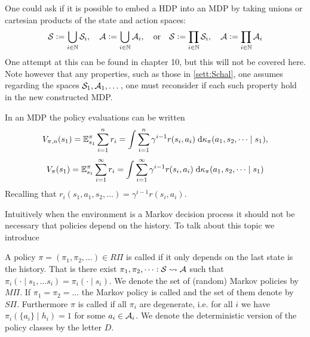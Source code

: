 \begin{rem}
  One could ask if it is possible to embed a HDP into an MDP
  by taking unions or cartesian products of the state and action spaces:
  \[ \mathcal{S} \vcentcolon= \bigcup_{i\in\mathbb{N}} \mathcal{S}_i, \quad
    \mathcal{A} \vcentcolon= \bigcup_{i\in\mathbb{N}} \mathcal{A}_i,
    \quad \mathrm{or} \quad
    \mathcal{S} \vcentcolon= \prod_{i\in\mathbb{N}} \mathcal{S}_i, \quad
  \mathcal{A} \vcentcolon= \prod_{i\in\mathbb{N}} \mathcal{A}_i \]
  One attempt at this can be found in  chapter 10,
  but this will not be covered here. %
  Note however that any properties, such as those in \cref{sett:Schal},
  one assumes regarding the spaces $\mathcal{S}_1, \mathcal{A}_1, \dots$, one must 
  reconsider if each such property hold in the new constructed MDP.
\end{rem}

\begin{rem}
  In an MDP the policy evaluations can be written
  \[ V_{\pi, n}(s_1)
    = \mathbb{E}^\pi_{s_1} \sum_{i=1}^n r_i
    = \int \sum_{i=1}^n \gamma^{i-1} r(s_i, a_i)
    \; \mathrm{d} \kappa_\pi (a_1, s_2, \dots \mid s_1),
  \]
  \[ V_\pi(s_1)
    = \mathbb{E}^\pi_{s_1} \sum_{i=1}^\infty r_i
    = \int \sum_{i=1}^\infty \gamma^{i-1} r(s_i, a_i)
    \; \mathrm{d} \kappa_\pi (a_1, s_2, \dots \mid s_1)
  \]
  Recalling that $r_i(s_1, a_1, s_2, \dots) = \gamma^{i-1} r(s_i, a_i)$.
\end{rem}

Intuitively when the environment is a Markov decision process
it should not be necessary that policies depend on the history.
To talk about this topic we introduce

\begin{defn}
  A policy $\pi = (\pi_1, \pi_2, \dots) \in R\Pi$
  is called  if it
  only depends on the last state is the history.
  That is there exist $\pi_1, \pi_2, \dots : \mathcal{S} \leadsto \mathcal{A}$
  such that $\pi_i(\cdot \mid s_1, \dots s_i) = \pi_i(\cdot \mid s_i)$.
  We denote the set of (random) Markov policies by $M\Pi$.
  If $\pi_1 = \pi_2 = \dots$ the Markov policy is called
  and the set of them denote by $S\Pi$.
  Furthermore $\pi$ is called  if all $\pi_i$
  are degenerate, i.e. for all $i$ we have
  $\pi_i(\{a_i\} \mid h_i) = 1$ for some $a_i \in \mathcal{A}_{i}$.
  We denote the deterministic version of the policy classes
  by the letter $D$.
\end{defn}

